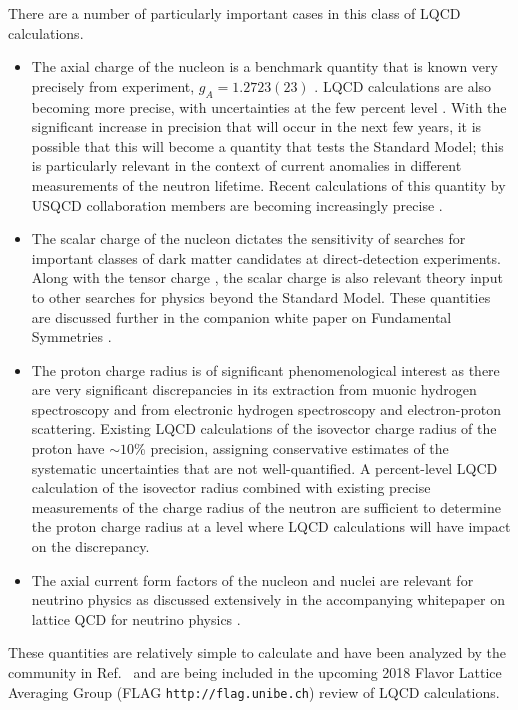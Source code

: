 There are a number of particularly important cases in this class of LQCD calculations. 
\begin{itemize}
	\item The axial charge of the nucleon is a benchmark quantity that is known very precisely from experiment, $g_A=1.2723(23)$ \cite{Patrignani:2016xqp}. LQCD calculations are also becoming more precise, with uncertainties at the few percent level  \cite{Bhattacharya:2016zcn,Yoon:2016jzj,Chang:2018uxx,Gupta:2018qil}. With the significant increase in precision that will occur in the next few years, it is possible that this will  become a quantity that tests the Standard Model; this is particularly relevant in the context of current anomalies in different measurements of the neutron lifetime. Recent calculations of this quantity by USQCD collaboration members are becoming increasingly precise .
	
	\item The scalar charge of the nucleon dictates the sensitivity of searches for important classes of dark matter candidates at direct-detection experiments. Along with the tensor charge \cite{Gupta:2018lvp}, the scalar charge is also relevant theory input to other searches for physics beyond the Standard Model. These quantities are discussed further in the companion white paper on Fundamental Symmetries \cite{wpfund}.
	
	\item The proton charge radius is  of significant phenomenological interest as there are very significant discrepancies in its extraction from muonic hydrogen spectroscopy  and from electronic hydrogen spectroscopy and electron-proton scattering. Existing LQCD calculations of the isovector charge radius of the proton \cite{Capitani:2015sba, Hasan:2017wwt,Alexandrou:2017ypw,Ishikawa:2018rew,Detmold:2018ptb,Alexandrou:2018sjm}  have $\sim10$\% precision, assigning conservative estimates of the systematic uncertainties that are not well-quantified. A  percent-level  LQCD calculation of the isovector radius combined with existing precise measurements of the charge radius of the neutron are sufficient to determine the proton charge radius at a level where LQCD calculations will  have impact on the discrepancy. 
	
	\item The axial current form factors of the nucleon and nuclei are relevant for neutrino physics as discussed extensively in the  accompanying whitepaper on lattice QCD for neutrino physics \cite{wpneutrino}.
\end{itemize} 
These quantities are relatively simple to calculate  and have been analyzed by the community in Ref.~\cite{Lin:2017snn} and  are being included in the upcoming 2018 Flavor Lattice Averaging Group (FLAG {\tt http://flag.unibe.ch})
review of LQCD calculations.


